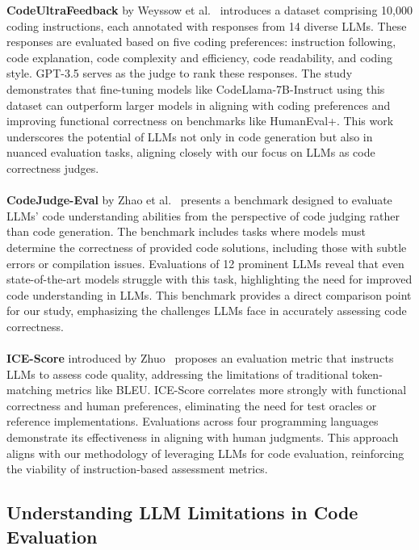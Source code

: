 \documentclass[a4paper]{usiinfbachelorproject}
\begin{document}
\textbf{CodeUltraFeedback} by Weyssow et al.~\cite{weyssow2024codeultrafeedback} introduces a dataset comprising 10,000 coding instructions, each annotated with responses from 14 diverse LLMs. These responses are evaluated based on five coding preferences: instruction following, code explanation, code complexity and efficiency, code readability, and coding style. GPT-3.5 serves as the judge to rank these responses. The study demonstrates that fine-tuning models like CodeLlama-7B-Instruct using this dataset can outperform larger models in aligning with coding preferences and improving functional correctness on benchmarks like HumanEval+. This work underscores the potential of LLMs not only in code generation but also in nuanced evaluation tasks, aligning closely with our focus on LLMs as code correctness judges.\\
\\[2pt]
\textbf{CodeJudge-Eval} by Zhao et al.~\cite{zhao2024codejudgeeval} presents a benchmark designed to evaluate LLMs' code understanding abilities from the perspective of code judging rather than code generation. The benchmark includes tasks where models must determine the correctness of provided code solutions, including those with subtle errors or compilation issues. Evaluations of 12 prominent LLMs reveal that even state-of-the-art models struggle with this task, highlighting the need for improved code understanding in LLMs. This benchmark provides a direct comparison point for our study, emphasizing the challenges LLMs face in accurately assessing code correctness.\\
\\[2pt]
\textbf{ICE-Score} introduced by Zhuo~\cite{zhuo2023icescore} proposes an evaluation metric that instructs LLMs to assess code quality, addressing the limitations of traditional token-matching metrics like BLEU. ICE-Score correlates more strongly with functional correctness and human preferences, eliminating the need for test oracles or reference implementations. Evaluations across four programming languages demonstrate its effectiveness in aligning with human judgments. This approach aligns with our methodology of leveraging LLMs for code evaluation, reinforcing the viability of instruction-based assessment metrics.

\subsection{Understanding LLM Limitations in Code Evaluation}
\end{document}

